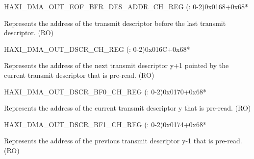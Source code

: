 \begin{register}{H}{AXI\_DMA\_OUT\_EOF\_BFR\_DES\_ADDR\_CH\_REG (: 0-2)}{0x0168+0x68*}\label{regdesc:AXIDMAOUTEOFBFRDESADDRCHNREG}
%
\regnewline%
\begin{regdesc}\begin{reglist}
\label{fielddesc:AXIDMAOUTEOFBFRDESADDRCHN}\item [AXI\_DMA\_OUT\_EOF\_BFR\_DES\_ADDR\_CH\regindex{n}] Represents the address of the transmit descriptor before the last transmit descriptor. (RO)
\end{reglist}\end{regdesc}
\end{register}


\begin{register}{H}{AXI\_DMA\_OUT\_DSCR\_CH\_REG (: 0-2)}{0x016C+0x68*}\label{regdesc:AXIDMAOUTDSCRCHNREG}
%
\regnewline%
\begin{regdesc}\begin{reglist}
\label{fielddesc:AXIDMAOUTLINKDSCRCHN}\item [AXI\_DMA\_OUTLINK\_DSCR\_CH\regindex{n}] Represents the address of the next transmit descriptor y+1 pointed by the current transmit descriptor that is pre-read. (RO)
\end{reglist}\end{regdesc}
\end{register}


\begin{register}{H}{AXI\_DMA\_OUT\_DSCR\_BF0\_CH\_REG (: 0-2)}{0x0170+0x68*}\label{regdesc:AXIDMAOUTDSCRBF0CHNREG}
%
\regnewline%
\begin{regdesc}\begin{reglist}
\label{fielddesc:AXIDMAOUTLINKDSCRBF0CHN}\item [AXI\_DMA\_OUTLINK\_DSCR\_BF0\_CH\regindex{n}] Represents the address of the current transmit descriptor y that is pre-read. (RO)
\end{reglist}\end{regdesc}
\end{register}


\begin{register}{H}{AXI\_DMA\_OUT\_DSCR\_BF1\_CH\_REG (: 0-2)}{0x0174+0x68*}\label{regdesc:AXIDMAOUTDSCRBF1CHNREG}
%
\regnewline%
\begin{regdesc}\begin{reglist}
\label{fielddesc:AXIDMAOUTLINKDSCRBF1CHN}\item [AXI\_DMA\_OUTLINK\_DSCR\_BF1\_CH\regindex{n}] Represents the address of the previous transmit descriptor y-1 that is pre-read. (RO)
\end{reglist}\end{regdesc}
\end{register}


